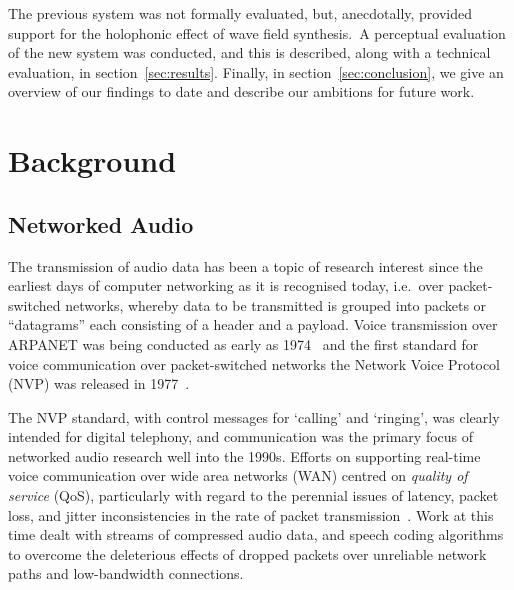 \documentclass[utf8]{FrontiersinHarvard}
\newcommand{\secref}[1]{section~\ref{#1}}
\begin{document}
    The previous system was not formally evaluated, but, anecdotally, provided
    support for the holophonic effect of wave field synthesis.\
    A perceptual evaluation of the new system was conducted, and this is
    described, along with a technical evaluation, in \secref{sec:results}.
    Finally, in \secref{sec:conclusion}, we give an overview of our findings to
    date and describe our ambitions for future work.

    \section{Background}\label{sec:background}

    \subsection{Networked Audio}\label{subsec:networked-audio}

    The transmission of audio data has been a topic of research interest since the
    earliest days of computer networking as it is recognised today, i.e.\ over
    packet-switched networks, whereby data to be transmitted is grouped into
    packets \textemdash{} or ``datagrams'' \textemdash{} each consisting of a header
    and a payload.
    Voice transmission over ARPANET was being conducted as early as
    1974~\citep{schulzrinne_voice_1992} and the first standard for voice
    communication over packet-switched networks \textemdash{} the Network Voice
    Protocol (NVP) \textemdash{} was released in
    1977~\citep{cohen_specifications_1977}.

    The NVP standard, with control messages for `calling' and `ringing', was
    clearly intended for digital telephony, and communication was the primary
    focus of networked audio research well into the 1990s.
    Efforts on supporting real-time voice communication over wide area networks
    (WAN) centred on \textit{quality of service} (QoS), particularly with regard
    to the perennial issues of latency, packet loss, and jitter
    \textemdash{} inconsistencies in the rate of packet
    transmission~\citep{hardman_reliable_1995,hardman_successful_1998}.
    Work at this time dealt with streams of compressed audio data, and speech
    coding algorithms to overcome the deleterious effects of dropped packets
    over unreliable network paths and low-bandwidth connections.
\end{document}
